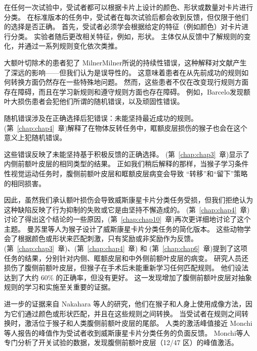 在任何一次试验中，受试者都可以根据卡片上设计的颜色、形状或数量对卡片进行分类。 
在标准版本的任务中，受试者在每次试验后都会收到反馈，但仅限于他们的选择是否正确。 
首先，受试者必须学会根据给定的特征（例如颜色）对卡片进行分类。 
实验者随后更改相关特征，例如，形状。 
主体仅从反馈中了解规则的变化，并通过一系列规则变化依次类推。
\par


大额叶切除术的患者犯了 MilnerMilner\cite{milner1963effects}所说的持续性错误，这种解释对文献产生了深远的影响——但我们认为是误导性的。 
这意味着患者在从先前成功的规则如何转换方面仍然存在一些特殊地问题。 
然而，这些患者不仅在改变现行规则方面存在障碍，而且在学习新规则和遵守规则方面也存在障碍。 
例如，Barcelo\cite{barcelo2002both}发现额叶大损伤患者会犯他们所谓的随机错误，以及顽固性错误。
\par


随机错误涉及在正确选择后犯错误：未能坚持最近成功的规则。 
(第~\ref{chap:chap4}~章)解释了在物体反转任务中，眶额皮层损伤的猴子也会在这个意义上犯随机错误\cite{rudebeck2008frontal}。
\par


这些错误反映了未能坚持基于积极反馈的正确选择。 (第~\ref{chap:chap3}~章)显示了内侧前额叶皮层的相同类型的结果。 
正如我们稍后解释的那样，当猴子学习条件性视觉运动任务时，腹侧前额叶皮层和眶额皮层病变会导致
“转移”和“留下”策略的相同损害\cite{bussey2001role}。
\par


因此，虽然我们承认额叶损伤会导致威斯康星卡片分类任务受损，但我们拒绝认为这种缺陷反映了行为抑制的失败或它是由坚持不懈造成的。 
(第~\ref{chap:chap4}~章)讨论了得出这个结论的一些原因，(第~\ref{chap:chap10}~章)再次更详细地讨论了这个主题。 
曼苏里等人\cite{mansouri2006prefrontal}为猴子设计了威斯康星卡片分类任务的简化版本。 
这些动物学会了根据颜色或形状来匹配刺激，只有奖励或非奖励作为反馈。 
(第~\ref{chap:chap3}~章)、(第~\ref{chap:chap4}~章) 和 (第~\ref{chap:chap6}~章)提到了这项任务的结果，分别针对内侧、眶额皮层和中外侧前额叶皮层的病变\cite{buckley2009dissociable}。
研究人员还损伤了腹侧前额叶皮层，但猴子在手术后未能重新学习任何匹配规则。
他们设法达到了大约 60\% 的正确率，但没有更好。
这一发现增加了腹侧前额叶皮层对抽象规则的学习和实施至关重要的证据。
\par


进一步的证据来自 Nakahara 等人的研究\cite{nakahara2002functional}，他们在猴子和人身上使用成像方法，因为它们通过颜色或形状匹配，并且在这些规则之间转换。 
当受试者在规则之间转换时，激活位于猴子和人类腹侧前额叶皮层的尾部。 
人类的激活峰值接近 Monchi 等人报告的峰值\cite{monchi2001wisconsin}作为受试者收到威斯康星卡片分类任务的负面反馈。
Monchi等人专门分析了开关试验的数据，发现腹侧前额叶皮层（12/47 区）的峰值激活。
\par


